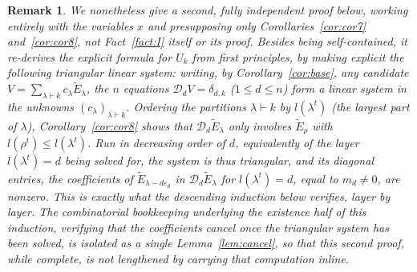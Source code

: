 \documentclass[10pt,a4paper]{amsart}
\newtheorem{remark}[theorem]{Remark}
\begin{document}
\begin{remark}
We nonetheless give a second, fully independent proof below, working entirely with the variables $x$ and presupposing only Corollaries~\ref{cor:cor7} and~\ref{cor:cor8}, not Fact~\ref{fact:I} itself or its proof. Besides being self-contained, it re-derives the explicit formula for $U_k$ from first principles, by making explicit the following \emph{triangular} linear system: writing, by Corollary~\ref{cor:base}, any candidate $V=\sum_{\lambda\vdash k}c_\lambda\widetilde E_\lambda$, the $n$ equations $\mathcal D_dV=\delta_{d,k}$ ($1\le d\le n$) form a linear system in the unknowns $(c_\lambda)_{\lambda\vdash k}$. Ordering the partitions $\lambda\vdash k$ by $l(\lambda^t)$ (the largest part of $\lambda$), Corollary~\ref{cor:cor8} shows that $\mathcal D_d\widetilde E_\lambda$ only involves $\widetilde E_\rho$ with $l(\rho^t)\le l(\lambda^t)$. Run in decreasing order of $d$, equivalently of the layer $l(\lambda^t)=d$ being solved for, the system is thus triangular, and its diagonal entries, the coefficients of $\widetilde E_{\lambda-d\varepsilon_d}$ in $\mathcal D_d\widetilde E_\lambda$ for $l(\lambda^t)=d$, equal to $m_d\ne0$, are nonzero. This is exactly what the descending induction below verifies, layer by layer. The combinatorial bookkeeping underlying the existence half of this induction, verifying that the coefficients cancel once the triangular system has been solved, is isolated as a single Lemma~\ref{lem:cancel}, so that this second proof, while complete, is not lengthened by carrying that computation inline.
\end{remark}
\end{document}

